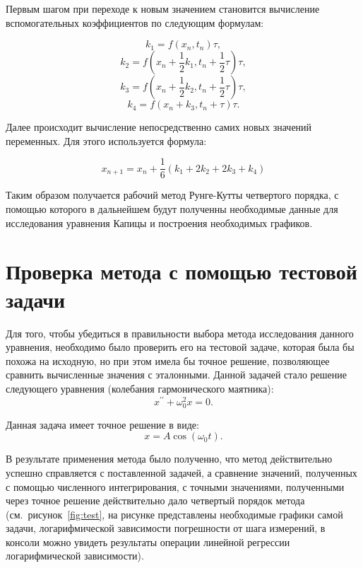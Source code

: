 \documentclass[a4paper,12pt]{article}
\begin{document}
	Первым шагом при переходе к новым значением становится вычисление 
	вспомогательных коэффициентов по следующим формулам:

	\newpage

	\begin{equation}
		k_1 = f(x_n, t_n)\tau,
	\end{equation}
	\begin{equation}
		k_2 = f(x_n + \frac12 k_1, t_n + \frac12 \tau)\tau,
	\end{equation}
	\begin{equation}
		k_3 = f(x_n + \frac12 k_2, t_n + \frac12 \tau)\tau,
	\end{equation}
	\begin{equation}
		k_4 = f(x_n + k_3, t_n + \tau)\tau.
	\end{equation}

	Далее происходит вычисление непосредственно самих новых значений 
	переменных. Для этого используется формула:

	\begin{equation}
		x_{n+1} = x_n + \frac16(k_1 + 2k_2 + 2k_3 + k_4)
	\end{equation}

	Таким образом получается рабочий метод Рунге-Кутты четвертого порядка, с
	помощью которого в дальнейшем будут полученны необходимые данные для 
	исследования уравнения Капицы и построения необходимых графиков.

	\section{Проверка метода с помощью тестовой задачи}

	Для того, чтобы убедиться в правильности выбора метода исследования
	данного уравнения, необходимо было проверить его на тестовой задаче, 
	которая была бы похожа на исходную, но при этом имела бы точное решение,
	позволяющее сравнить вычисленные значения с эталонными. Данной задачей 
	стало решение следующего уравнения (колебания гармонического маятника):
	\begin{equation}
		x^{\prime\prime} + \omega_0^2 x = 0.
	\end{equation}

	Данная задача имеет точное решение в виде:
	\begin{equation}
		x = A\cos(\omega_0t).
	\end{equation}
	
	В результате применения метода было полученно, что метод действительно 
	успешно справляется с поставленной задачей, а сравнение значений, 
	полученных с помощью численного интегрирования, с точными значениями, 
	полученными через точное решение действительно дало четвертый порядок 
	метода (см.~рисунок~\ref{fig:test}, на рисунке представлены необходимые
	графики самой задачи, логарифмической зависимости погрешности от шага
	измерений, в консоли можно увидеть результаты операции линейной регрессии
	логарифмической зависимости).
\end{document}
